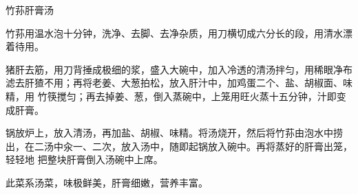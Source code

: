 \begin{recipe}{竹荪肝膏汤}

\ingredients


\preparation

\step 竹荪用温水泡十分钟，洗净、去脚、去净杂质，用刀横切成六分长的段，用清水漂
着待用。

\step 猪肝去筋，用刀背捶成极细的浆，盛入大碗中，加入冷透的清汤拌匀，用稀眼净布
滤去肝猹不用；再将老姜、大葱拍松，放入肝汁中，加鸡蛋二个、盐、胡椒面、味精，用
竹筷搅匀；再去掉姜、葱，倒入蒸碗中，上笼用旺火蒸十五分钟，汁即变成肝膏。

\step 锅放炉上，放入清汤，再加盐、胡椒、味精。将汤烧开，然后将竹荪由泡水中捞
出，在二汤中汆一、二次，放入汤中，随即起锅放入碗中。再将蒸好的肝膏出笼，轻轻地
把整块肝膏倒入汤碗中上席。

\features

此菜系汤菜，味极鲜美，肝膏细嫩，营养丰富。

\end{recipe}

